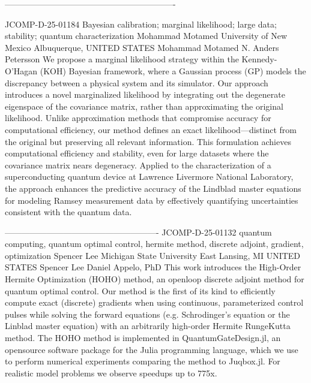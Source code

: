 -------------------------------------------------------------

JCOMP-D-25-01184
Bayesian calibration; marginal likelihood; large data; stability; quantum
characterization
Mohammad Motamed
University of New Mexico
Albuquerque, UNITED STATES
Mohammad Motamed
N. Anders Petersson
We propose a marginal likelihood strategy within the Kennedy-O’Hagan (KOH)
Bayesian framework, where a Gaussian process (GP) models the discrepancy
between a physical system and its simulator. Our approach introduces a novel
marginalized likelihood by integrating out the degenerate eigenspace of the covariance
matrix, rather than approximating the original likelihood. Unlike approximation methods
that compromise accuracy for computational efficiency, our method defines an exact
likelihood—distinct from the original but preserving all relevant information. This
formulation achieves computational efficiency and stability, even for large datasets
where the covariance matrix nears degeneracy. Applied to the characterization of a
superconducting quantum device at Lawrence Livermore National Laboratory, the
approach enhances the predictive accuracy of the Lindblad master equations for
modeling Ramsey measurement data by effectively quantifying uncertainties consistent
with the quantum data.

-------------------------------------------------------
JCOMP-D-25-01132
quantum computing, quantum optimal control, hermite method, discrete adjoint,
gradient, optimization
Spencer Lee
Michigan State University
East Lansing, MI UNITED STATES
Spencer Lee
Daniel Appelo, PhD
This work introduces the High-Order Hermite Optimization (HOHO) method, an openloop discrete adjoint method for quantum optimal control. Our method is the first of its
kind to efficiently compute exact (discrete) gradients when using continuous,
parameterized control pulses while solving the forward equations (e.g. Schrodinger's
equation or the Linblad master equation) with an arbitrarily high-order Hermite RungeKutta method. The HOHO method is implemented in QuantumGateDesign.jl, an opensource software package for the Julia programming language, which we use to perform
numerical experiments comparing the method to Juqbox.jl. For realistic model
problems we observe speedups up to 775x.

